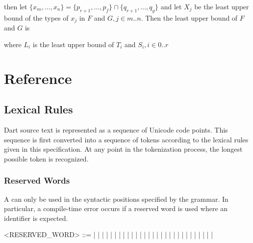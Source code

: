 \documentclass[makeidx]{article}
\begin{document}
{\begin{itemize}
then let
$\{x_m, \ldots, x_n\} = \{p_{r+1}, \ldots, p_f\} \cap \{q_{r+1}, \ldots, q_g\}$
and let $X_j$ be the least upper bound of the types of $x_j$ in $F$ and
$G, j \in m .. n$.
Then the least upper bound of $F$ and $G$ is

\noindent
{}

where $L_i$ is the least upper bound of $T_i$ and $S_i, i \in 0 .. r$
\end{itemize}



\section{Reference}


\subsection{Lexical Rules}

\LMHash{}%
Dart source text is represented as a sequence of Unicode code points.
This sequence is first converted into a sequence of tokens
according to the lexical rules given in this specification.
At any point in the tokenization process,
the longest possible token is recognized.


\subsubsection{Reserved Words}

\LMHash{}%
A  can only be used in the syntactic positions
specified by the grammar.
In particular, a compile-time error occurs if a reserved word is used
where an identifier is expected.


\begin{grammar}
<RESERVED\_WORD> ::= \ASSERT{} | \BREAK{} | \CASE{} | \CATCH{} |
    \CLASS{} | \CONST{}
  \alt\hspace{-3mm} \CONTINUE{} | \DEFAULT{} | \DO{} | \ELSE{} | \ENUM{} |
    \EXTENDS{} | \FALSE{} | \FINAL{} | \FINALLY{} | \FOR{}
  \alt\hspace{-3mm} \IF{} | \IN{} | \IS{} | \NEW{} | \NULL{} | \RETHROW{} |
    \RETURN{} | \SUPER{} | \SWITCH{} | \THIS{} | \THROW{}
  \alt\hspace{-3mm} \TRUE{} | \TRY{} | \VAR{} | \VOID{} | \WHILE{} | \WITH{}
\end{grammar}

}
\end{document}
